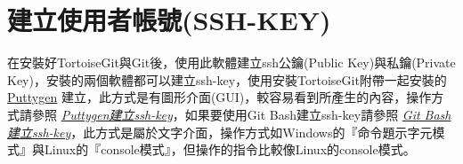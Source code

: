 \documentclass[letterpaper,10pt,english]{sphinxmanual}
\begin{document}
\section{建立使用者帳號(SSH-KEY)}
\label{_doc/writing/index:ssh-key}
在安裝好TortoiseGit與Git後，使用此軟體建立ssh公鑰(Public Key)與私鑰(Private Key)，安裝的兩個軟體都可以建立ssh-key，使用安裝TortoiseGit附帶一起安裝的 \href{http://www.chiark.greenend.org.uk/~sgtatham/putty/download.html}{Puttygen} 建立，此方式是有圖形介面(GUI)，較容易看到所產生的內容，操作方式請參照 {\hyperref[_doc/writing/index:ssh-key-puttygen]{\emph{Puttygen建立ssh-key}}}，如果要使用Git Bash建立ssh-key請參照 {\hyperref[_doc/writing/index:ssh-key-gitbash]{\emph{Git Bash建立ssh-key}}}，此方式是屬於文字介面，操作方式如Windows的『命令題示字元模式』與Linux的『console模式』，但操作的指令比較像Linux的console模式。
\end{document}
